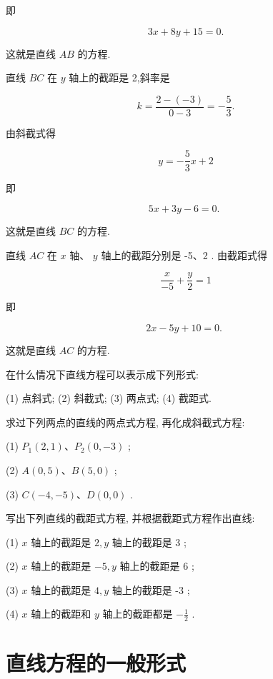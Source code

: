 \documentclass[lang=cn,newtx,12pt,scheme=chinese]{elegantbook}
\begin{document}
即

\[
    {3x} + {8y} + {15} = 0.
\]

这就是直线 \({AB}\) 的方程.

直线 \({BC}\) 在 \(y\) 轴上的截距是 2,斜率是

\[
  k = \frac{2 - \left( {-3}\right) }{0 - 3} = - \frac{5}{3}.
\]

由斜截式得

\[
  y = - \frac{5}{3}x + 2
\]

即

\[
    {5x} + {3y} - 6 = 0\text{. }
\]

这就是直线 \({BC}\) 的方程.

直线 \({AC}\) 在 \(x\) 轴、 \(y\) 轴上的截距分别是 -5、2 . 由截距式得

\[
  \frac{x}{-5} + \frac{y}{2} = 1
\]

即

\[
    {2x} - {5y} + {10} = 0\text{. }
\]

这就是直线 \({AC}\) 的方程.

\begin{problemset}[练习]

\item 在什么情况下直线方程可以表示成下列形式:

(1) 点斜式; (2) 斜截式; (3) 两点式; (4) 截距式.

\item 求过下列两点的直线的两点式方程, 再化成斜截式方程:

(1) \({P}_{1}\left( {2,1}\right) \text{、}{P}_{2}\left( {0, - 3}\right)\) ;

(2) \(A\left( {0,5}\right) \text{、}B\left( {5,0}\right)\) ;

(3) \(C\left( {-4, - 5}\right) \text{、}D\left( {0,0}\right)\) .

\item 写出下列直线的截距式方程, 并根据截距式方程作出直线:

(1) \(x\) 轴上的截距是 \(2,y\) 轴上的截距是 3 ;

(2) \(x\) 轴上的截距是 \(- 5,y\) 轴上的截距是 6 ;

(3) \(x\) 轴上的截距是 \(4,y\) 轴上的截距是 -3 ;

(4) \(x\) 轴上的截距和 \(y\) 轴上的截距都是 \(- \frac{1}{2}\) .
\end{problemset}

\section{直线方程的一般形式}
\end{document}
